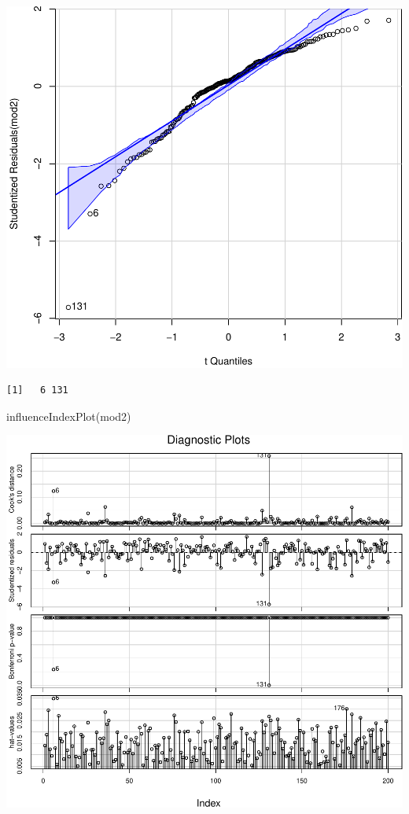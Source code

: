 \documentclass[
]{article}
\newenvironment{Shaded}{\begin{snugshade}}{\end{snugshade}}
\newcommand{\FunctionTok}[1]{\textcolor[rgb]{0.00,0.00,0.00}{#1}}
\newcommand{\NormalTok}[1]{#1}
\begin{document}
\begin{center}\includegraphics{SDM-CHAP24_files/figure-latex/daignos-2} \end{center}

\begin{verbatim}
[1]   6 131
\end{verbatim}

\begin{Shaded}
\begin{Highlighting}[]
\FunctionTok{influenceIndexPlot}\NormalTok{(mod2)}
\end{Highlighting}
\end{Shaded}

\begin{center}\includegraphics{SDM-CHAP24_files/figure-latex/daignos-3} \end{center}
\end{document}
